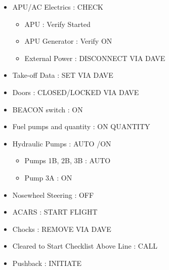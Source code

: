 \begin{itemize}
\item APU\slash AC Electrics : CHECK

\begin{itemize}
\item APU : Verify Started

\item APU Generator : Verify ON

\item External Power : DISCONNECT VIA DAVE

\end{itemize}

\item Take-off Data : SET VIA DAVE

\item Doors : CLOSED\slash LOCKED VIA DAVE

\item BEACON switch : ON

\item Fuel pumps and quantity : ON QUANTITY

\item Hydraulic Pumps : AUTO \slash  ON

\begin{itemize}
\item Pumps 1B, 2B, 3B : AUTO

\item Pump 3A : ON

\end{itemize}

\item Nosewheel Steering : OFF

\item ACARS : START FLIGHT

\item Chocks : REMOVE VIA DAVE

\item Cleared to Start Checklist Above Line : CALL

\item Pushback : INITIATE

\end{itemize}

